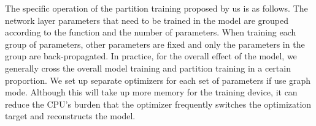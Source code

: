 The specific operation of the partition training proposed by us is as follows.
The network layer parameters that need to be trained in the model are grouped according to the function and the number of parameters.
When training each group of parameters,
    other parameters are fixed and only the parameters in the group are back-propagated.
In practice, for the overall effect of the model,
    we generally cross the overall model training and partition training in a certain proportion.
We set up separate optimizers for each set of parameters if use graph mode.
Although this will take up more memory for the training device,
    it can reduce the CPU's burden that the optimizer frequently switches the optimization target and reconstructs the model.

